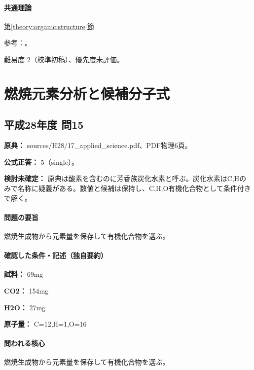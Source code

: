 \paragraph{共通理論} \hyperref[theory:organic:structure]{第\ref*{theory:organic:structure}節}

\par 参考：\cite{organic_isomers}。

\par 難易度 2（校準初稿）、優先度未評価。

\section{燃焼元素分析と候補分子式}

\subsection{平成28年度 問15}
\label{q:h28-reg-applied-15}

\noindent\textbf{原典：} sources/H28/17\_applied\_science.pdf、PDF物理6頁。

\textbf{公式正答：} 5（single）。

\par\textbf{検討未確定：} 原典は酸素を含むのに芳香族炭化水素と呼ぶ。炭化水素はC,Hのみで名称に疑義がある。数値と候補は保持し、C,H,O有機化合物として条件付きで解く。

\paragraph{問題の要旨} 燃焼生成物から元素量を保存して有機化合物を選ぶ。

\paragraph{確認した条件・記述（独自要約）}\mbox{}\par

\noindent\textbf{試料：} 69mg\par

\noindent\textbf{CO2：} 154mg\par

\noindent\textbf{H2O：} 27mg\par

\noindent\textbf{原子量：} C=\allowbreak{}12,H=\allowbreak{}1,O=\allowbreak{}16\par

\paragraph{問われる核心} 燃焼生成物から元素量を保存して有機化合物を選ぶ。

